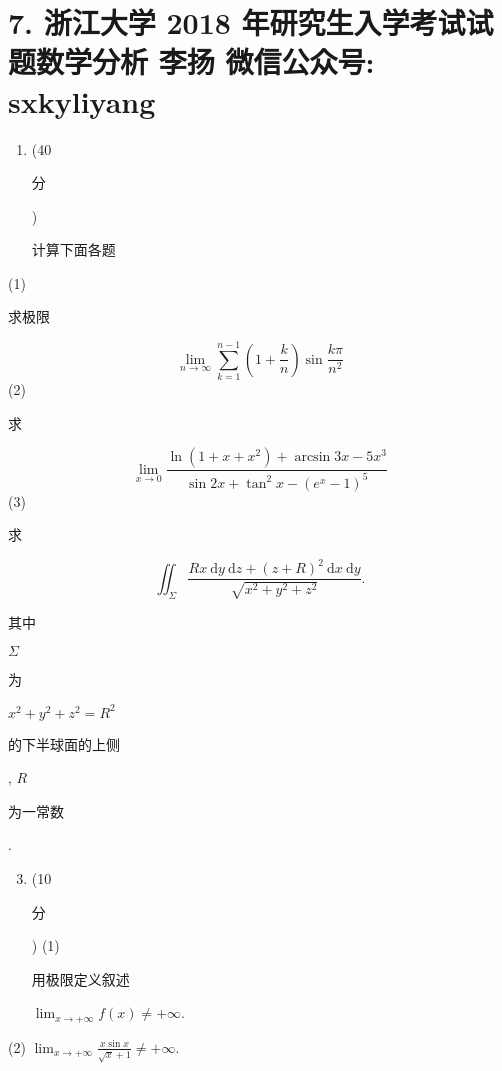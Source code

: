 \documentclass[10pt]{article}
\begin{document}
\section{7. 浙江大学 2018 年研究生入学考试试题数学分析 
 李扬 
 微信公众号: sxkyliyang}
\begin{enumerate}
  \item (40 \begin{CJK}{UTF8}{mj}分\end{CJK}) \begin{CJK}{UTF8}{mj}计算下面各题\end{CJK}
\end{enumerate}
(1) \begin{CJK}{UTF8}{mj}求极限\end{CJK}
$$
\lim _{n \rightarrow \infty} \sum_{k=1}^{n-1}\left(1+\frac{k}{n}\right) \sin \frac{k \pi}{n^{2}}
$$
(2) \begin{CJK}{UTF8}{mj}求\end{CJK}
$$
\lim _{x \rightarrow 0} \frac{\ln \left(1+x+x^{2}\right)+\arcsin 3 x-5 x^{3}}{\sin 2 x+\tan ^{2} x-\left(e^{x}-1\right)^{5}}
$$
(3) \begin{CJK}{UTF8}{mj}求\end{CJK}
$$
\iint_{\Sigma} \frac{R x \mathrm{~d} y \mathrm{~d} z+(z+R)^{2} \mathrm{~d} x \mathrm{~d} y}{\sqrt{x^{2}+y^{2}+z^{2}}} .
$$
\begin{CJK}{UTF8}{mj}其中\end{CJK} $\Sigma$ \begin{CJK}{UTF8}{mj}为\end{CJK} $x^{2}+y^{2}+z^{2}=R^{2}$ \begin{CJK}{UTF8}{mj}的下半球面的上侧\end{CJK}, $R$ \begin{CJK}{UTF8}{mj}为一常数\end{CJK}.

\begin{enumerate}
  \setcounter{enumi}{2}
  \item (10 \begin{CJK}{UTF8}{mj}分\end{CJK}) (1) \begin{CJK}{UTF8}{mj}用极限定义叙述\end{CJK} $\lim _{x \rightarrow+\infty} f(x) \neq+\infty$.
\end{enumerate}
(2) $\lim _{x \rightarrow+\infty} \frac{x \sin x}{\sqrt{x}+1} \neq+\infty$.
\end{document}
